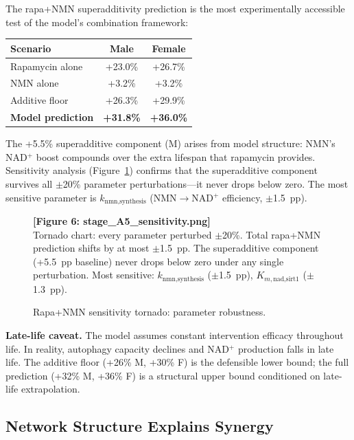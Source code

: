 \documentclass[11pt]{article}
\begin{document}
The rapa+NMN superadditivity prediction is the most experimentally accessible test of the model's combination framework:

\begin{center}
\begin{tabular}{@{}lcc@{}}
\toprule
Scenario & Male & Female \\
\midrule
Rapamycin alone & +23.0\% & +26.7\% \\
NMN alone & +3.2\% & +3.2\% \\
Additive floor & +26.3\% & +29.9\% \\
\textbf{Model prediction} & \textbf{+31.8\%} & \textbf{+36.0\%} \\
\bottomrule
\end{tabular}
\end{center}

The +5.5\% superadditive component (M) arises from model structure: NMN's NAD$^+$ boost compounds over the extra lifespan that rapamycin provides. Sensitivity analysis (Figure~\ref{fig:tornado}) confirms that the superadditive component survives all $\pm$20\% parameter perturbations---it never drops below zero. The most sensitive parameter is $k_{\text{nmn,synthesis}}$ (NMN$\to$NAD$^+$ efficiency, $\pm$1.5~pp).

\begin{figure}[ht]
\centering
\textbf{[Figure 6: stage\_A5\_sensitivity.png]}\\[4pt]
\small Tornado chart: every parameter perturbed $\pm$20\%. Total rapa+NMN prediction shifts by at most $\pm$1.5~pp. The superadditive component (+5.5~pp baseline) never drops below zero under any single perturbation. Most sensitive: $k_{\text{nmn,synthesis}}$ ($\pm$1.5~pp), $K_{m,\text{nad,sirt1}}$ ($\pm$1.3~pp).
\caption{Rapa+NMN sensitivity tornado: parameter robustness.}
\label{fig:tornado}
\end{figure}

\textbf{Late-life caveat.} The model assumes constant intervention efficacy throughout life. In reality, autophagy capacity declines and NAD$^+$ production falls in late life. The additive floor (+26\% M, +30\% F) is the defensible lower bound; the full prediction (+32\% M, +36\% F) is a structural upper bound conditioned on late-life extrapolation.

\subsection{Network Structure Explains Synergy}
\end{document}
